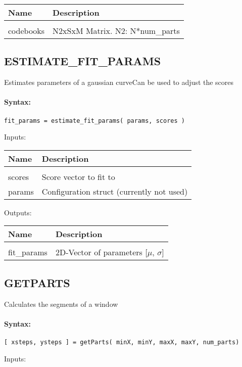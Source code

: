\begin{tabular}{|l|p{5cm}|}
\hline
\textbf{Name} & \textbf{Description} \\
\hline \hline \\
codebooks & N2xSxM Matrix. N2: N*num\_parts  \\ \hline
\end{tabular}

\subsection{ESTIMATE\_FIT\_PARAMS}

Estimates parameters of a gaussian curveCan be used to adjust the scores

\paragraph{Syntax:} \verb|fit_params = estimate_fit_params( params, scores )|

Inputs:

\begin{tabular}{|l|p{5cm}|}
\hline
\textbf{Name} & \textbf{Description} \\
\hline \hline \\
scores & Score vector to fit to  \\ \hline
params & Configuration struct (currently not used)  \\ \hline
\end{tabular}
Outputs:

\begin{tabular}{|l|p{5cm}|}
\hline
\textbf{Name} & \textbf{Description} \\
\hline \hline \\
fit\_params & 2D-Vector of parameters [$\mu$, $\sigma$]  \\ \hline
\end{tabular}

\subsection{GETPARTS}

Calculates the segments of a window

\paragraph{Syntax:} \verb|[ xsteps, ysteps ] = getParts( minX, minY, maxX, maxY, num_parts)|

Inputs:


